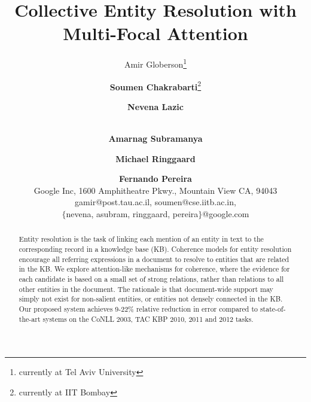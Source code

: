 \documentclass[11pt]{article}
\title{Collective Entity Resolution with Multi-Focal Attention}
\author{Amir Globerson\thanks{\;\;currently at Tel Aviv University} \and {\bf Soumen Chakrabarti}\thanks{\;\;currently at IIT Bombay} \and {\bf Nevena Lazic} \and \\ {\bf Amarnag Subramanya} \and {\bf Michael Ringgaard}
\and {\bf Fernando Pereira} \\ 
Google Inc, 1600 Amphitheatre Pkwy., Mountain View CA, 94043 \\
gamir@post.tau.ac.il, soumen@cse.iitb.ac.in, \\ $\{$nevena, asubram, ringgaard, pereira$\}$@google.com}
\date{}
\begin{document}
\maketitle

\begin{abstract}
Entity resolution is the task of linking each mention of an entity in
text to the corresponding record in a knowledge base (KB).  Coherence
models for entity resolution encourage all referring expressions in a
document to resolve to entities that are related in the KB. 
We explore attention-like mechanisms for coherence, where the evidence for each
candidate is based on a small set of strong relations, rather than relations
to all other entities in the document. 
The rationale is that document-wide support may simply not exist 
for non-salient entities, or entities not densely connected in the KB.
Our proposed system achieves 9-22\% relative reduction in error
compared to state-of-the-art systems on the CoNLL 2003, TAC KBP 2010, 2011
and 2012 tasks.
\end{abstract}














\end{document}
